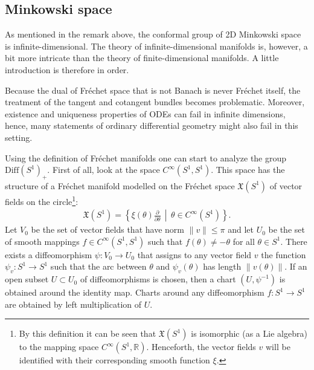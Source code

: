\subsection{Minkowski space}

    As mentioned in the remark above, the conformal group of 2D Minkowski space is infinite-dimensional. The theory of infinite-dimensional manifolds is, however, a bit more intricate than the theory of finite-dimensional manifolds. A little introduction is therefore in order.

    \begin{remark}
        Because the dual of Fr\'echet space that is not Banach is never Fr\'echet itself, the treatment of the tangent and cotangent bundles becomes problematic. Moreover, existence and uniqueness properties of ODEs can fail in infinite dimensions, hence, many statements of ordinary differential geometry might also fail in this setting.
    \end{remark}

    Using the definition of Fr\'echet manifolds one can start to analyze the group $\mathrm{Diff}(S^1)_+$. First of all, look at the space $C^\infty(S^1,S^1)$. This space has the structure of a Fr\'echet manifold modelled on the Fr\'echet space $\mathfrak{X}(S^1)$ of vector fields on the circle\footnote{By this definition it can be seen that $\mathfrak{X}(S^1)$ is isomorphic (as a Lie algebra) to the mapping space $C^\infty(S^1,\mathbb{R})$. Henceforth, the vector fields $v$ will be identified with their corresponding smooth function $\xi$.}:
    \begin{gather}
        \mathfrak{X}(S^1) = \left\{\xi(\theta)\frac{\partial}{\partial\theta}\,\middle\vert\,\theta\in C^\infty(S^1)\right\}.
    \end{gather}
    Let $V_0$ be the set of vector fields that have norm $\|v\|\leq\pi$ and let $U_0$ be the set of smooth mappings $f\in C^\infty(S^1,S^1)$ such that $f(\theta)\neq-\theta$ for all $\theta\in S^1$. There exists a diffeomorphism $\psi:V_0\rightarrow U_0$ that assigns to any vector field $v$ the function $\psi_v:S^1\rightarrow S^1$ such that the arc between $\theta$ and $\psi_v(\theta)$ has length $\|v(\theta)\|$. If an open subset $U\subset U_0$ of diffeomorphisms is chosen, then a chart $(U,\psi^{-1})$ is obtained around the identity map. Charts around any diffeomorphism $f:S^1\rightarrow S^1$ are obtained by left multiplication of $U$.

